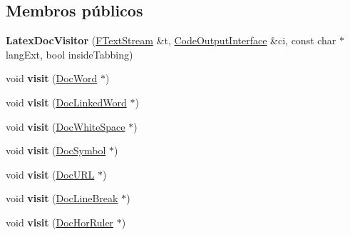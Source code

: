 \subsection*{Membros públicos}
\begin{DoxyCompactItemize}
\item 
\hypertarget{class_latex_doc_visitor_a42b34af70d97c146eacac9437ccc131e}{{\bfseries Latex\-Doc\-Visitor} (\hyperlink{class_f_text_stream}{F\-Text\-Stream} \&t, \hyperlink{class_code_output_interface}{Code\-Output\-Interface} \&ci, const char $\ast$lang\-Ext, bool inside\-Tabbing)}\label{class_latex_doc_visitor_a42b34af70d97c146eacac9437ccc131e}

\item 
\hypertarget{class_latex_doc_visitor_ac60f6c2f041b955124e3ba6b63111ca5}{void {\bfseries visit} (\hyperlink{class_doc_word}{Doc\-Word} $\ast$)}\label{class_latex_doc_visitor_ac60f6c2f041b955124e3ba6b63111ca5}

\item 
\hypertarget{class_latex_doc_visitor_ab957281f81eaa9db582ac66f014ef342}{void {\bfseries visit} (\hyperlink{class_doc_linked_word}{Doc\-Linked\-Word} $\ast$)}\label{class_latex_doc_visitor_ab957281f81eaa9db582ac66f014ef342}

\item 
\hypertarget{class_latex_doc_visitor_a8e427da6441fcfec76f860101da1b132}{void {\bfseries visit} (\hyperlink{class_doc_white_space}{Doc\-White\-Space} $\ast$)}\label{class_latex_doc_visitor_a8e427da6441fcfec76f860101da1b132}

\item 
\hypertarget{class_latex_doc_visitor_aba7904fef0b15b1ff249f41815d3b739}{void {\bfseries visit} (\hyperlink{class_doc_symbol}{Doc\-Symbol} $\ast$)}\label{class_latex_doc_visitor_aba7904fef0b15b1ff249f41815d3b739}

\item 
\hypertarget{class_latex_doc_visitor_a38b6defe4c1e4aa2fb6bbc944f58f93c}{void {\bfseries visit} (\hyperlink{class_doc_u_r_l}{Doc\-U\-R\-L} $\ast$)}\label{class_latex_doc_visitor_a38b6defe4c1e4aa2fb6bbc944f58f93c}

\item 
\hypertarget{class_latex_doc_visitor_a1719b7dfc3a83b7976ff5997f56cd474}{void {\bfseries visit} (\hyperlink{class_doc_line_break}{Doc\-Line\-Break} $\ast$)}\label{class_latex_doc_visitor_a1719b7dfc3a83b7976ff5997f56cd474}

\item 
\hypertarget{class_latex_doc_visitor_aeed3d42f5e96c4016fbc6ab678f5549a}{void {\bfseries visit} (\hyperlink{class_doc_hor_ruler}{Doc\-Hor\-Ruler} $\ast$)}\label{class_latex_doc_visitor_aeed3d42f5e96c4016fbc6ab678f5549a}


\end{DoxyCompactItemize}
